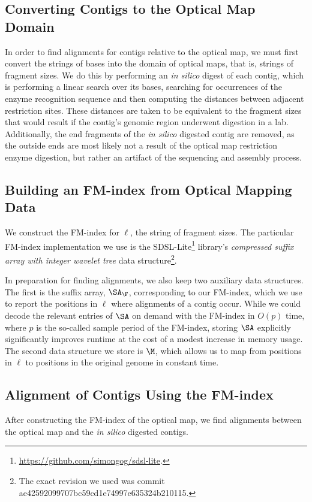 \documentclass[doctor]{thesis}
\begin{document}
\subsection{Converting Contigs to the Optical Map Domain}

In order to find alignments for contigs relative to the optical map, we must first convert the strings of bases into the domain of optical maps, that is, strings of fragment sizes.
We do this by performing an {\em in silico} digest of each contig, which is performing a linear search over its bases, searching for occurrences of the enzyme recognition sequence and then computing the distances between adjacent restriction sites. 
These distances are taken to be equivalent to the fragment sizes that would result if the contig's genomic region underwent digestion in a lab.  
Additionally, the end fragments of the {\em in silico} digested contig are removed, as the outside ends are most likely not a result of the optical map restriction enzyme digestion, but rather an artifact of the sequencing and assembly process.


\subsection{Building an FM-index from Optical Mapping Data}
\label{subsec-buildfm}



We construct the FM-index for $\ell$, the string of 
fragment sizes. 
The particular FM-index implementation we use is the SDSL-Lite\footnote{\url{https://github.com/simongog/sdsl-lite}.} \cite{SDSL}
library's \emph{compressed suffix array with integer wavelet tree} data structure\footnote{The exact revision we used was commit ae42592099707bc59cd1e74997e635324b210115.}.


In preparation for finding alignments, we also keep two auxiliary data structures. The first is the suffix array, $\SA_{\scriptsize \F}$, corresponding to our FM-index, which we use to report the positions in $\ell$ where alignments of a contig occur. While we could decode the relevant entries of $\SA$ on demand with the FM-index in $O(p)$ time, where $p$ is the so-called sample period of the FM-index, storing $\SA$ explicitly significantly improves runtime at the cost of a modest increase in memory usage. The second data structure we store is $\M$, which allows us to map from positions in $\ell$ to positions in the original genome in constant time.

\subsection{Alignment of Contigs Using the FM-index}
After constructing the FM-index of the optical map, we find alignments between the optical map and the {\em in silico} digested contigs.  
\end{document}
